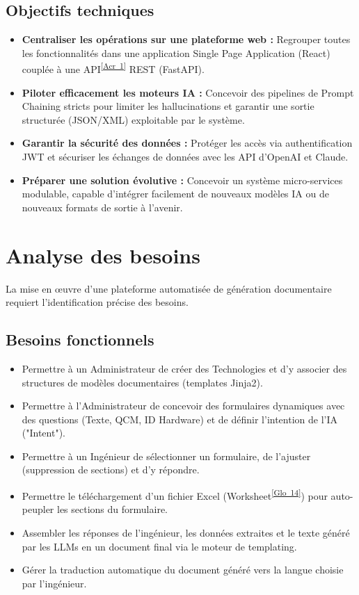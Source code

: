 \documentclass[12pt, a4paper]{report}
\newcommand{\acref}[1]{\textsuperscript{\hyperlink{acr:#1}{[Acr~#1]}}}
\newcommand{\gloref}[1]{\textsuperscript{\hyperlink{glo:#1}{[Glo~#1]}}}
\begin{document}
\subsection{Objectifs techniques}
\begin{itemize}
    \item \textbf{Centraliser les opérations sur une plateforme web :} Regrouper toutes les fonctionnalités dans une application Single Page Application (React) couplée à une API\acref{1} REST (FastAPI).
    \item \textbf{Piloter efficacement les moteurs IA :} Concevoir des pipelines de Prompt Chaining stricts pour limiter les hallucinations et garantir une sortie structurée (JSON/XML) exploitable par le système.
    \item \textbf{Garantir la sécurité des données :} Protéger les accès via authentification JWT et sécuriser les échanges de données avec les API d'OpenAI et Claude.
    \item \textbf{Préparer une solution évolutive :} Concevoir un système micro-services modulable, capable d’intégrer facilement de nouveaux modèles IA ou de nouveaux formats de sortie à l'avenir.
\end{itemize}

\section{Analyse des besoins}
La mise en œuvre d’une plateforme automatisée de génération documentaire requiert l’identification précise des besoins. 

\subsection{Besoins fonctionnels}
\begin{itemize}
    \item Permettre à un Administrateur de créer des Technologies et d'y associer des structures de modèles documentaires (templates Jinja2).
    \item Permettre à l'Administrateur de concevoir des formulaires dynamiques avec des questions (Texte, QCM, ID Hardware) et de définir l'intention de l'IA ("Intent").
    \item Permettre à un Ingénieur de sélectionner un formulaire, de l'ajuster (suppression de sections) et d'y répondre.
    \item Permettre le téléchargement d'un fichier Excel (Worksheet\gloref{14}) pour auto-peupler les sections du formulaire.
    \item Assembler les réponses de l'ingénieur, les données extraites et le texte généré par les LLMs en un document final via le moteur de templating.
    \item Gérer la traduction automatique du document généré vers la langue choisie par l'ingénieur.
\end{itemize}
\end{document}
